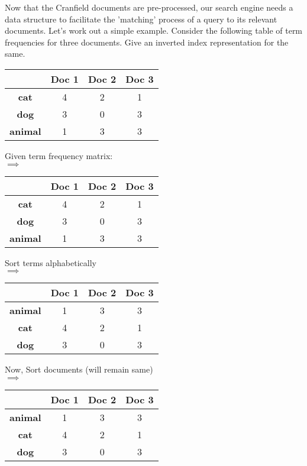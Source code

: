 \documentclass[11pt]{exam}
\begin{document}
\begin{questions}
\question Now that the Cranfield documents are pre-processed, our search engine needs a data
structure to facilitate the ’matching’ process of a query to its relevant documents. Let’s
work out a simple example. Consider the following table of term frequencies for three
documents. Give an inverted index representation for the same.
    \begin{center}
    \begin{tabular}{ |c||c|c|c| } 
     \hline
     &\textbf{Doc 1} & \textbf{Doc 2} & \textbf{Doc 3} \\ 
     \hline\hline
     \textbf{cat}& 4 & 2 & 1 \\ 
     \hline
     \textbf{dog}& 3 & 0 & 3 \\ 
     \hline
     \textbf{animal}& 1 & 3 & 3 \\ 
     \hline
    \end{tabular}
    \end{center}
    
\begin{solution}
    Given term frequency matrix:\\
    $\implies$
    \begin{center}
    \begin{tabular}{ |c||c|c|c| } 
     \hline
     &\textbf{Doc 1} & \textbf{Doc 2} & \textbf{Doc 3} \\ 
     \hline\hline
     \textbf{cat}& 4 & 2 & 1 \\ 
     \hline
     \textbf{dog}& 3 & 0 & 3 \\ 
     \hline
     \textbf{animal}& 1 & 3 & 3 \\ 
     \hline
    \end{tabular}
    \end{center}
    Sort terms alphabetically\\
    $\implies$
    \begin{center}
    \begin{tabular}{ |c||c|c|c| } 
     \hline
     &\textbf{Doc 1} & \textbf{Doc 2} & \textbf{Doc 3} \\ 
     \hline\hline
     \textbf{animal}& 1 & 3 & 3 \\ 
     \hline
     \textbf{cat}& 4 & 2 & 1 \\ 
     \hline
     \textbf{dog}& 3 & 0 & 3 \\ 
     \hline
    \end{tabular}
    \end{center}
    Now, Sort documents (will remain same)\\
    $\implies$
    \begin{center}
    \begin{tabular}{ |c||c|c|c|} 
     \hline
     &\textbf{Doc 1} & \textbf{Doc 2} & \textbf{Doc 3} \\ 
     \hline\hline
     \textbf{animal}& 1 & 3 & 3 \\ 
     \hline
     \textbf{cat}& 4 & 2 & 1 \\ 
     \hline
     \textbf{dog}& 3 & 0 & 3 \\ 
     \hline
    \end{tabular}
    \end{center}
    

\end{solution}
\end{questions}
\end{document}

